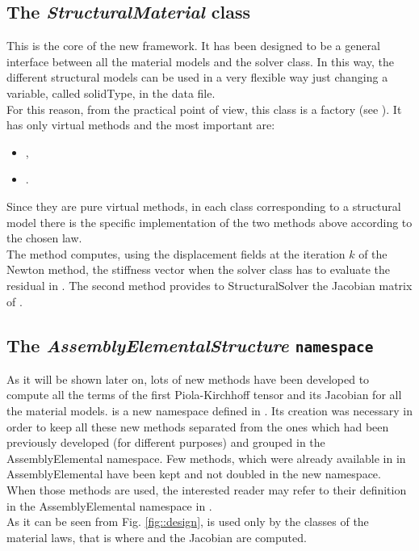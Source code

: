 \subsection{The \textit{StructuralMaterial} class}
This is the core of the new framework. It has been designed to be a general interface between all the material models and the solver class. In this way, the different structural models can be used in a very flexible way just changing a variable, called solidType, in the data file.\\
For this reason, from the practical point of view, this class is a factory (see \cite{DesignPattern}). It has only virtual methods and the most important are:
\begin{itemize}
  \item {},
  \item {}.
\end{itemize}
Since they are pure virtual methods, in each class corresponding to a structural model there is the specific implementation of the two methods above according to the chosen law.\\
The method  computes, using the displacement fields at the iteration $k$ of the Newton method, the stiffness vector when the solver class has to evaluate the residual in . The second method provides to StructuralSolver the Jacobian matrix of \Piola.\\ 

\subsection{The \textit{AssemblyElementalStructure} \texttt{namespace}}
As it will be shown later on, lots of new methods have been developed to compute all the terms of the first Piola-Kirchhoff tensor and its Jacobian for all the material models.
\AES is a new namespace defined in \LV. Its creation was necessary in order to keep all these new methods separated from the ones which had been previously developed (for different purposes) and grouped in the AssemblyElemental namespace. Few methods, which were already available in \LV in AssemblyElemental have been kept and not doubled in the new namespace. When those methods are used, the interested reader may refer to their definition in the AssemblyElemental namespace in .\\
As it can be seen from Fig. \ref{fig::design}, \AES is used only by the classes of the material laws, that is where \Piola and the Jacobian are computed.



